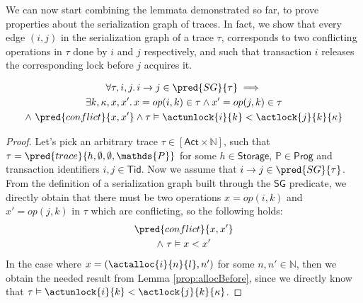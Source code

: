 We can now start combining the lemmata demonstrated so far, to prove properties about the serialization graph of traces. In fact, we show that every edge $(i, j)$ in the serialization graph of a trace $\tau$, corresponds to two conflicting operations in $\tau$ done by $i$ and $j$ respectively, and such that transaction $i$ releases the corresponding lock before $j$ acquires it.
\begin{lem}
	\label{lem:sg1}
	\begin{gather*}
	\forall \tau, i, j \ldotp i \rightarrow j \in \pred{SG}{\tau} \implies \\
	\exists k, \kappa, x, x' \ldotp x = op(i, k) \in \tau \land x' = op(j, k) \in \tau \\
	\land\ \pred{conflict}{x, x'} \land \tau \vDash \actunlock{i}{k} < \actlock{j}{k}{\kappa}
	\end{gather*}
	\begin{proof}
	Let's pick an arbitrary trace $\tau \in [\mathsf{Act} \times \mathds{N}]$, such that $\tau = \pred{trace}{h, \emptyset, \emptyset, \mathds{P}}$ for some $h \in \mathsf{Storage}$, $\mathds{P} \in \mathsf{Prog}$ and transaction identifiers $i, j \in \mathsf{Tid}$. Now we assume that $i \rightarrow j \in \pred{SG}{\tau}$. From the definition of a serialization graph built through the $\mathsf{SG}$ predicate, we directly obtain that there must be two operations $x = op(i, k)$ and $x' = op(j, k)$ in $\tau$ which are conflicting, so the following holds:
	\begin{gather}
		\label{lem:sg1.4}
		\pred{conflict}{x, x'} \\
		\label{lem:sg1.5}
		\land\ \tau \vDash x < x'
	\end{gather}
	In the case where $x = (\actalloc{i}{n}{l}, n')$ for some $n, n' \in \mathds{N}$, then we obtain the needed result from Lemma \ref{prop:allocBefore}, since we directly know that $\tau \vDash \actunlock{i}{k} < \actlock{j}{k}{\kappa}$.
	

\end{proof}
\end{lem}
